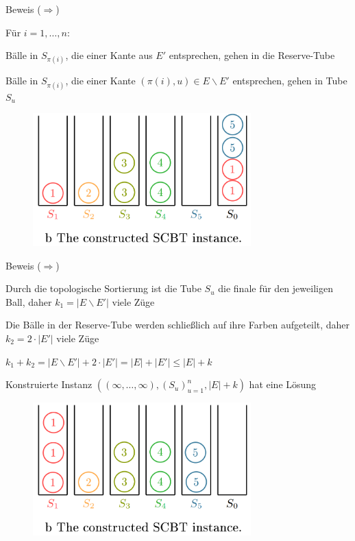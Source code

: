 \documentclass{beamer}
\begin{document}
\begin{frame}{Beweis (\glqq $\Rightarrow$\grqq)}
\begin{pointlist}
\item Für $i=1,\dots,n$:
\begin{arrowlist}
\item Bälle in $S_{\pi(i)}$, die einer Kante aus $E'$ entsprechen, gehen in die Reserve-Tube 
\item Bälle in $S_{\pi(i)}$, die einer Kante $(\pi(i),u)\in E\backslash E'$ entsprechen, gehen in Tube $S_u$
\end{arrowlist}
\end{pointlist}
\begin{figure}
    \centering
    \includegraphics[width=0.75\textwidth]{proofr4}
\end{figure}
\end{frame}

\begin{frame}{Beweis (\glqq $\Rightarrow$\grqq)}
\begin{pointlist}
\item Durch die topologische Sortierung ist die Tube $S_u$ die finale für den jeweiligen Ball, daher $k_1 = |E\backslash E'|$ viele Züge
\item Die Bälle in der Reserve-Tube werden schließlich auf ihre Farben aufgeteilt, daher $k_2 = 2\cdot |E'|$ viele Züge
\item $k_1 + k_2 =  |E\backslash E'| + 2\cdot |E'| = |E| + |E'| \leq |E| + k$
\item Konstruierte Instanz $((\infty, \dots, \infty), (S_u)_{u=1}^n, |E|+k)$ hat eine Lösung
\end{pointlist}
\begin{figure}
    \centering
    \includegraphics[width=0.75\textwidth]{proofr5}
\end{figure}
\end{frame}
\end{document}
